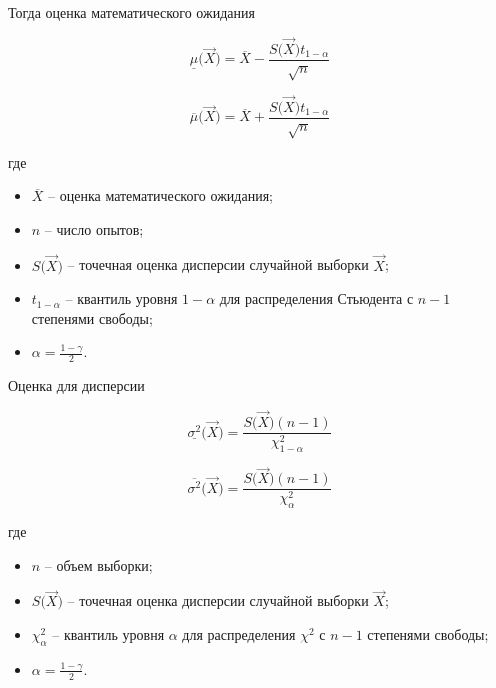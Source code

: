 Тогда оценка математического ожидания

\begin{equation*}
    \underline{\mu} \big( \vec X \big) = \overline X - \frac{S\big( \vec X \big) t_{1 - \alpha}}{\sqrt{n}}
\end{equation*}

\begin{equation*}
    \overline{\mu} \big( \vec X \big) = \overline X + \frac{S\big( \vec X \big) t_{1 - \alpha}}{\sqrt{n}}
\end{equation*}

где

\begin{itemize}
    \item $\overline X$ -- оценка математического ожидания;
    \item $n$ -- число опытов;
    \item $S \big( \vec X \big)$ -- точечная оценка дисперсии случайной выборки $\vec X$;
    \item $t_{1-\alpha}$ -- квантиль уровня $1 - \alpha$ для распределения Стьюдента с $n-1$ степенями свободы;
    \item $\alpha = \frac{1-\gamma}{2}$.
\end{itemize}

Оценка для дисперсии

\begin{equation*}
    \underline{\sigma^2} \big( \vec X \big) = \frac{S \big( \vec X \big) (n - 1)}{\chi^2_{1 - \alpha}}
\end{equation*}

\begin{equation*}
    \overline{\sigma^2} \big( \vec X \big) = \frac{S \big( \vec X \big) (n - 1)}{\chi^2_{\alpha}}
\end{equation*}

где

\begin{itemize}
    \item $n$ -- объем выборки;
    \item $S \big( \vec X \big)$ -- точечная оценка дисперсии случайной выборки $\vec X$;
    \item $\chi^2_\alpha$ -- квантиль уровня $\alpha$ для распределения $\chi^2$ с $n-1$ степенями свободы;
    \item $\alpha = \frac{1-\gamma}{2}$.
\end{itemize}
